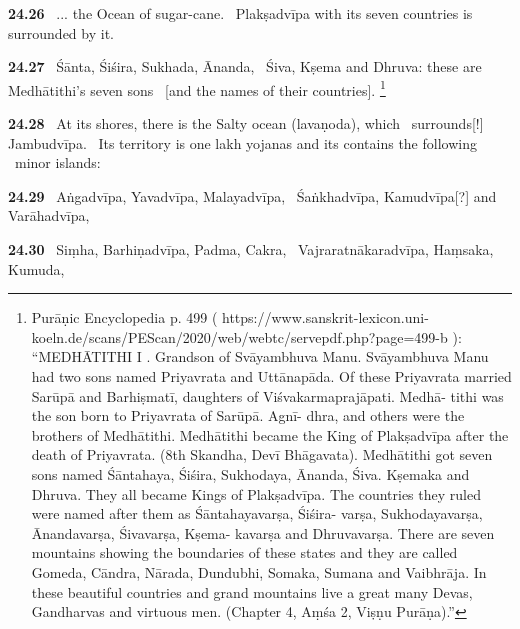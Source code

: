 \documentclass{article}
\begin{document}
\textbf{24.26}%
\ ... the Ocean of sugar-cane.%
\ Plakṣadvīpa with its seven countries is surrounded by it.%


\textbf{24.27}%
\ Śānta, Śiśira, Sukhada, Ānanda,%
\ Śiva, Kṣema and Dhruva: these are Medhātithi's seven sons%
\              [and the names of their countries].%
\footnote{Purāṇic Encyclopedia p. 499        ( https://www.sanskrit-lexicon.uni-koeln.de/scans/PEScan/2020/web/webtc/servepdf.php?page=499-b ):                                ``MEDHĀTITHI I . Grandson of Svāyambhuva Manu.                                Svāyambhuva Manu had two sons named Priyavrata and                                Uttānapāda. Of these Priyavrata married Sarūpā and                                Barhiṣmatī, daughters of Viśvakarmaprajāpati. Medhā-                                tithi was the son born to Priyavrata of Sarūpā. Agnī-                                dhra, and others were the brothers of Medhātithi.                                Medhātithi became the King of Plakṣadvīpa after the                                death of Priyavrata. (8th Skandha, Devī Bhāgavata).                                Medhātithi got seven sons named Śāntahaya, Śiśira,                                Sukhodaya, Ānanda, Śiva. Kṣemaka and Dhruva. They                                all became Kings of Plakṣadvīpa. The countries they                                ruled were named after them as Śāntahayavarṣa, Śiśira-                                varṣa, Sukhodayavarṣa, Ānandavarṣa, Śivavarṣa, Kṣema-                                kavarṣa and Dhruvavarṣa. There are seven mountains                                showing the boundaries of these states and they are                                called Gomeda, Cāndra, Nārada, Dundubhi, Somaka,                                Sumana and Vaibhrāja. In these beautiful countries                                and grand mountains live a great many Devas,                                Gandharvas and virtuous men. (Chapter 4, Aṃśa 2,                                Viṣṇu Purāṇa).'' }%


\textbf{24.28}%
\ At its shores, there is the Salty ocean (lavaṇoda), which%
\              surrounds[!] Jambudvīpa.%
\ Its territory is one lakh yojanas and its contains the following%
\              minor islands:%


\textbf{24.29}%
\ Aṅgadvīpa, Yavadvīpa, Malayadvīpa,%
\ Śaṅkhadvīpa, Kamudvīpa[?] and Varāhadvīpa,%


\textbf{24.30}%
\ Siṃha, Barhiṇadvīpa, Padma, Cakra,%
\ Vajraratnākaradvīpa, Haṃsaka, Kumuda,%
\end{document}
